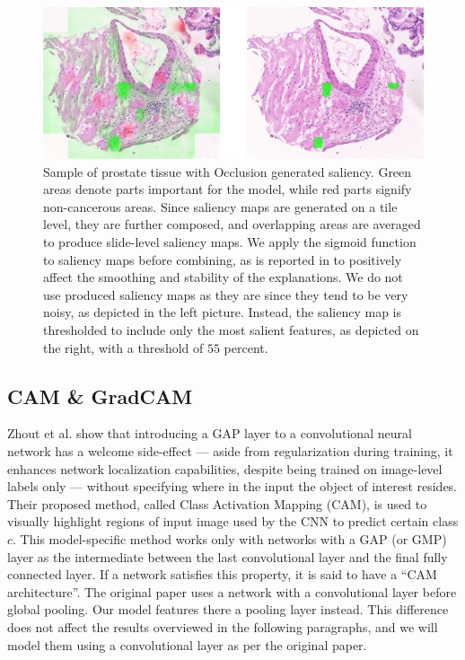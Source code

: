 \begin{figure}[!h]
    \begin{center}
    \begin{minipage}{1\textwidth}
      \includegraphics[width=\textwidth]{img/occlusion.png}
    \end{minipage}
    \caption{Sample of prostate tissue with Occlusion generated saliency. Green areas denote parts important for the model, while red parts signify non-cancerous areas. Since saliency maps are generated on a tile level, they are further composed, and overlapping areas are averaged to produce slide-level saliency maps. We apply the sigmoid function to saliency maps before combining, as is reported in \cite{gallo} to positively affect the smoothing and stability of the explanations. We do not use produced saliency maps as they are since they tend to be very noisy, as depicted in the left picture. Instead, the saliency map is thresholded to include only the most salient features, as depicted on the right, with a threshold of $55$ percent.}
    \label{fig:occ-saliency}
    \end{center}
\end{figure}

\subsection{CAM \& GradCAM}\label{subsec:cam}

Zhout et al. \cite{cam} show that introducing a GAP layer to a convolutional neural network has a welcome side-effect --- aside from regularization during training, it enhances network localization capabilities, despite being trained on image-level labels only --- without specifying where in the input the object of interest resides.
Their proposed method, called Class Activation Mapping (CAM), is used to visually highlight regions of input image used by the CNN to predict certain class $c$.
This model-specific method works only with networks with a GAP (or GMP) layer as the intermediate between the last convolutional layer and the final fully connected layer.
If a network satisfies this property, it is said to have a ``CAM architecture''.
The original paper uses a network with a convolutional layer before global pooling.
Our model features there a pooling layer instead.
This difference does not affect the results overviewed in the following paragraphs, and we will model them using a convolutional layer as per the original paper. 

